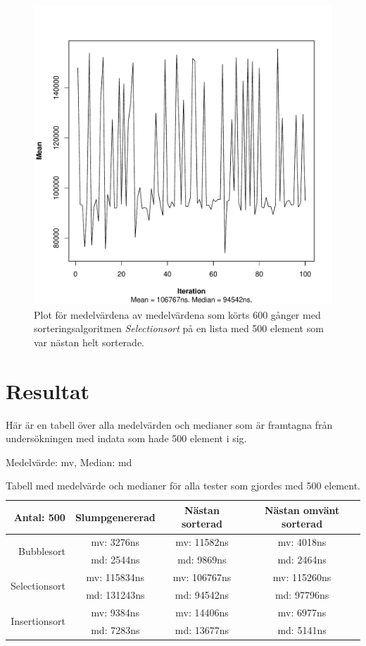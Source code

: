 \documentclass[a4paper]{article}
\begin{document}
\begin{figure}[H]
	\begin{center}
		\includegraphics[scale=0.4]{output/500/AlmostSorted/selectionSort_almost_sorted_500_600_100.pdf}
		\caption{Plot för medelvärdena av medelvärdena som körts 600 gånger med sorteringsalgoritmen \emph{Selectionsort} på en lista med 500 element som var nästan helt sorterade.}
		\label{selectionSort}
	\end{center}
\end{figure}

\section{Resultat}
Här är en tabell över alla medelvärden och medianer som är framtagna från undersökningen med indata som hade 500 element i sig. 

Medelvärde: mv, Median: md 
\begin{table}[H]
	\begin{tabular}{r|c|c|c|}
		Antal: 500 & Slumpgenererad & Nästan sorterad & Nästan omvänt sorterad \\ \hline
		\multirow{2}{*}{Bubblesort}    & mv: 3276ns & mv: 11582ns & mv: 4018ns \\
		                               & md: 2544ns & md: 9869ns & md: 2464ns \\ \hline
		\multirow{2}{*}{Selectionsort} & mv: 115834ns & mv: 106767ns & mv: 115260ns \\
		                               & md: 131243ns & md: 94542ns & md: 97796ns \\ \hline
		\multirow{2}{*}{Insertionsort} & mv: 9384ns & mv: 14406ns & mv: 6977ns \\
		                               & md: 7283ns & md: 13677ns & md: 5141ns \\ \hline	
	\end{tabular}
	\caption{Tabell med medelvärde och medianer för alla tester som gjordes med 500 element.}
	\label{Tabel500}
\end{table}
\end{document}
